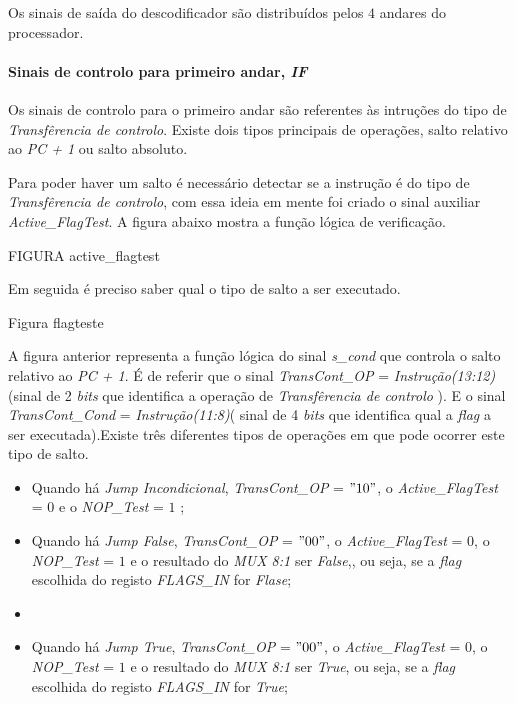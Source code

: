 \documentclass[11pt]{article}
\numberwithin{equation}{section}
\begin{document}
	Os sinais de saída do descodificador são distribuídos pelos $4$ andares do processador.
	
\paragraph{Sinais de controlo para primeiro andar, \textit{IF}}

	
	Os sinais de controlo para o primeiro andar são referentes às intruções do tipo de \textit{Transfêrencia de controlo}. Existe dois tipos principais de operações, salto relativo ao \textit{PC + 1} ou salto absoluto. 
	
	Para poder haver um salto é necessário detectar se a instrução é do tipo de \textit{Transfêrencia de controlo}, com essa ideia em mente foi criado o sinal auxiliar \textit{Active\_FlagTest}. A figura abaixo mostra a função lógica de verificação. 
	
	FIGURA active\_flagtest
	
	Em seguida é preciso saber qual o tipo de salto a ser executado. 
	
	Figura flagteste
	
	A figura anterior representa a função lógica do sinal \textit{s\_cond} que controla o salto relativo ao \textit{PC + 1}. É  de referir que o sinal \textit{TransCont\_OP} = \textit{Instrução(13:12)}(sinal de 2 \textit{bits} que identifica a operação de \textit{Transfêrencia de controlo} ). E o sinal \textit{TransCont\_Cond} = \textit{Instrução(11:8)}( sinal de 4 \textit{bits} que identifica qual a \textit{flag} a ser executada).Existe três diferentes tipos de operações em que pode ocorrer este tipo de salto.
		\begin{itemize}
			\item Quando há \textit{Jump Incondicional}, \textit{TransCont\_OP} = $"10"$, o  \textit{Active\_FlagTest} = $0$ e o  \textit{NOP\_Test} = $1$ ;
			\vspace{-2.5mm}
			\item Quando há \textit{Jump False}, \textit{TransCont\_OP} = $"00"$, o  \textit{Active\_FlagTest} = $0$, o  \textit{NOP\_Test} = $1$ e o resultado do \textit{MUX 8:1} ser \textit{False},, ou seja, se a \textit{flag} escolhida do registo \textit{FLAGS\_IN} for \textit{Flase};
			\vspace{-2.5mm}
			\item  \item Quando há \textit{Jump True}, \textit{TransCont\_OP} = $"00"$, o  \textit{Active\_FlagTest} = $0$, o  \textit{NOP\_Test} = $1$ e o resultado do \textit{MUX 8:1} ser \textit{True}, ou seja, se a \textit{flag} escolhida do registo \textit{FLAGS\_IN} for \textit{True};
		\end{itemize}
	
\end{document}

